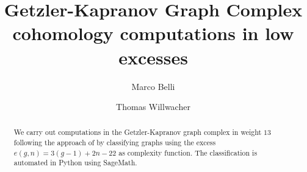 \documentclass[12pt]{amsart}
\author{Marco Belli}
\author{Thomas Willwacher}
\title{Getzler-Kapranov Graph Complex cohomology computations in low excesses}
\theoremstyle{definition}
\numberwithin{equation}{section}
\theoremstyle{definition} %
\theoremstyle{remark}
\begin{document}
\begin{abstract}
    We carry out computations in the Getzler-Kapranov graph complex in weight $13$ following the approach of \cite{CLPW2} by classifying graphs using the excess $e(g,n)=3(g-1)+2n-22$ as complexity function. The classification is automated in Python using SageMath.
\end{abstract}

\maketitle











%






\end{document}
